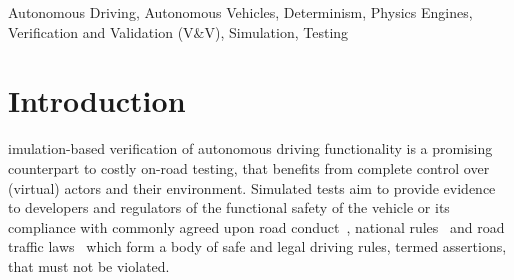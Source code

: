 \documentclass[letterpaper, 10 pt, journal, twoside]{IEEEtran}
\begin{document}
\begin{abstract}
\end{abstract}

\begin{IEEEkeywords}
Autonomous Driving, Autonomous Vehicles, Determinism, Physics Engines,  Verification and Validation (V\&V), Simulation, Testing
\end{IEEEkeywords}
\IEEEpeerreviewmaketitle

\section{Introduction} \label{s:introduction}
%
imulation-based verification of autonomous driving functionality is a promising counterpart to costly on-road testing, that benefits from complete control over (virtual) actors and their environment.
%
Simulated tests aim to provide evidence to developers and regulators of the functional safety of the vehicle or its compliance with commonly agreed upon road conduct~\cite{ViennaConv}, national rules~\cite{codes2015highway} and road traffic laws~\cite{RoadTraffic1988} which form a body of safe and legal driving rules, termed assertions, that must not be violated. 
\end{document}
